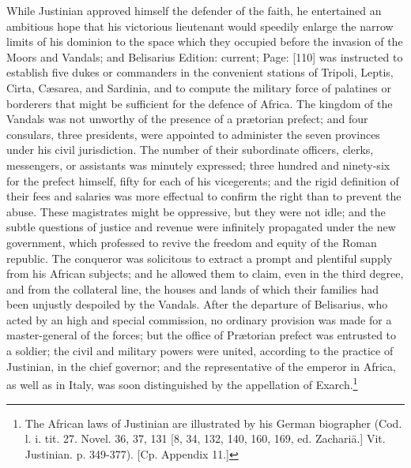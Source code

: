 While Justinian approved himself the defender of the faith, he entertained an ambitious hope that his victorious lieutenant would speedily enlarge the narrow limits of his dominion to the space which they occupied before the invasion of the Moors and Vandals; and Belisarius Edition: current; Page: [110] was instructed to establish five dukes or commanders in the convenient stations of Tripoli, Leptis, Cirta, Cæsarea, and Sardinia, and to compute the military force of palatines or borderers that might be sufficient for the defence of Africa. The kingdom of the Vandals was not unworthy of the presence of a prætorian prefect; and four consulars, three presidents, were appointed to administer the seven provinces under his civil jurisdiction. The number of their subordinate officers, clerks, messengers, or assistants was minutely expressed; three hundred and ninety-six for the prefect himself, fifty for each of his vicegerents; and the rigid definition of their fees and salaries was more effectual to confirm the right than to prevent the abuse. These magistrates might be oppressive, but they were not idle; and the subtle questions of justice and revenue were infinitely propagated under the new government, which professed to revive the freedom and equity of the Roman republic. The conqueror was solicitous to extract a prompt and plentiful supply from his African subjects; and he allowed them to claim, even in the third degree, and from the collateral line, the houses and lands of which their families had been unjustly despoiled by the Vandals. After the departure of Belisarius, who acted by an high and special commission, no ordinary provision was made for a master-general of the forces; but the office of Prætorian prefect was entrusted to a soldier; the civil and military powers were united, according to the practice of Justinian, in the chief governor; and the representative of the emperor in Africa, as well as in Italy, was soon distinguished by the appellation of Exarch.\footnote{The African laws of Justinian are illustrated by his German biographer (Cod. l. i. tit. 27. Novel. 36, 37, 131 [8, 34, 132, 140, 160, 169, ed. Zachariä.] Vit. Justinian. p. 349-377). [Cp. Appendix 11.]}

